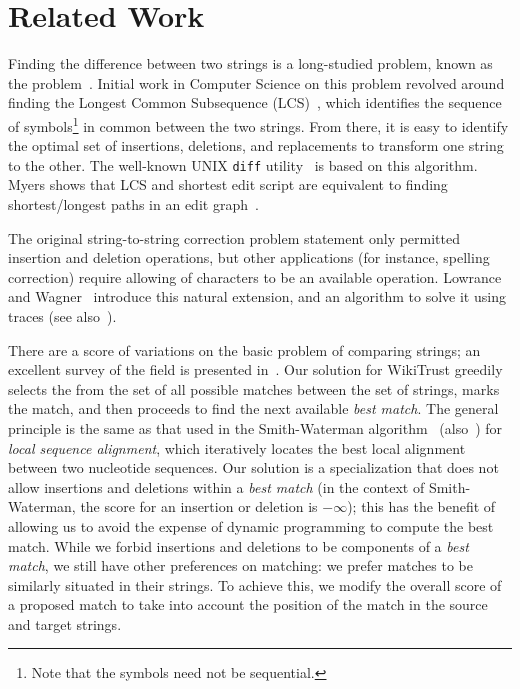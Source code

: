 \section{Related Work}
\label{sec:diff-related}

Finding the difference between two strings is a long-studied problem,
known as the  problem~\cite{Wagner1974}.
Initial work in Computer Science on this problem revolved around finding the
Longest Common Subsequence (LCS)~\cite{Gusfield1999}, which identifies the
sequence of symbols\footnote{Note that the symbols need not be sequential.}
in common between the two strings.
From there, it is easy to identify the optimal
set of insertions, deletions, and replacements to transform
one string to the other.
The well-known UNIX \texttt{diff} utility~\cite{Hunt1976} is based
on this algorithm.
Myers shows that LCS and shortest edit script are equivalent to finding
shortest/longest paths in an edit graph~\cite{Myers1986}.

The original string-to-string correction problem statement
only permitted insertion and deletion operations, but other applications
(for instance, spelling correction) require allowing 
of characters to be an available operation.
Lowrance and Wagner~\cite{Lowrance1975} introduce this natural extension,
and an algorithm to solve it using traces
(see also~\cite{Wagner1975,Sankoff1999}).


There are a score of variations on the basic problem of
comparing strings; an excellent survey of the field is
presented in~\cite{Sankoff1999}.
Our solution for WikiTrust greedily selects the 
from the set of all possible matches between the set of strings, marks
the match, and then proceeds to find the next available \textit{best match}.
The general principle is the same as that used in the
Smith-Waterman algorithm~\cite{Smith1981} (also~\cite[Ch.~10]{Sankoff1999})
for \textit{local sequence alignment}, which iteratively locates the
best local alignment between two nucleotide sequences.
Our solution is a specialization that does not allow insertions
and deletions within a \textit{best match} (in the context of
Smith-Waterman, the score for an insertion or deletion is $-\infty$);
this has the benefit of allowing us to avoid the expense of dynamic
programming to compute the best match.
While we forbid insertions and deletions to be components of
a \textit{best match}, we still have other preferences on matching:
we prefer matches to be similarly situated in their strings.
To achieve this, we modify the overall score of a proposed match to take
into account the position of the match in the source and target strings.

